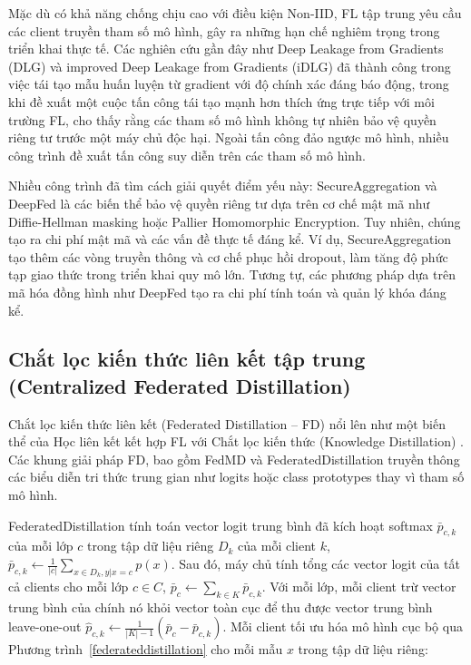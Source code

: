 Mặc dù có khả năng chống chịu cao với điều kiện Non-IID, FL tập trung yêu cầu các client truyền tham số mô hình, gây ra những hạn chế nghiêm trọng trong triển khai thực tế. Các nghiên cứu gần đây như Deep Leakage from Gradients (DLG) \cite{zhu2019dlg} và improved Deep Leakage from Gradients (iDLG) \cite{zhao2020idlg} đã thành công trong việc tái tạo mẫu huấn luyện từ gradient với độ chính xác đáng báo động, trong khi \cite{geiping2020inverting} đề xuất một cuộc tấn công tái tạo mạnh hơn thích ứng trực tiếp với môi trường FL, cho thấy rằng các tham số mô hình không tự nhiên bảo vệ quyền riêng tư trước một máy chủ độc hại. Ngoài tấn công đảo ngược mô hình, nhiều công trình đề xuất tấn công suy diễn \cite{pyrgelis2017knockknock, melis2019mia, ganju2018inference} trên các tham số mô hình.

Nhiều công trình đã tìm cách giải quyết điểm yếu này: SecureAggregation \cite{bonawitz2016secagg} và DeepFed \cite{li2020deepfed} là các biến thể bảo vệ quyền riêng tư dựa trên cơ chế mật mã như Diffie-Hellman masking hoặc Pallier Homomorphic Encryption. Tuy nhiên, chúng tạo ra chi phí mật mã và các vấn đề thực tế đáng kể. Ví dụ, SecureAggregation tạo thêm các vòng truyền thông và cơ chế phục hồi dropout, làm tăng độ phức tạp giao thức trong triển khai quy mô lớn. Tương tự, các phương pháp dựa trên mã hóa đồng hình như DeepFed tạo ra chi phí tính toán và quản lý khóa đáng kể.

\subsection{Chắt lọc kiến thức liên kết tập trung (Centralized Federated Distillation)}
\label{sec:fd}
Chắt lọc kiến thức liên kết (Federated Distillation -- FD) \cite{li2019fedmd, tan2022fedproto, jeong2018federateddistillation} nổi lên như một biến thể của Học liên kết kết hợp FL với Chắt lọc kiến thức (Knowledge Distillation) \cite{hinton2015kd}. Các khung giải pháp FD, bao gồm FedMD \cite{li2019fedmd} và FederatedDistillation \cite{jeong2018federateddistillation} truyền thông các biểu diễn tri thức trung gian như logits hoặc class prototypes \cite{tan2022fedproto} thay vì tham số mô hình.

FederatedDistillation tính toán vector logit trung bình đã kích hoạt softmax $\bar{p}_{c,k}$ của mỗi lớp $c$ trong tập dữ liệu riêng $D_k$ của mỗi client $k$, $\bar{p}_{c,k} \leftarrow \frac{1}{|c|}\sum_{x \in D_k, y|x = c}p(x)$. Sau đó, máy chủ tính tổng các vector logit của tất cả clients cho mỗi lớp $c \in C$, $\bar{p}_c \leftarrow \sum_{k \in K}\bar{p}_{c,k}$. Với mỗi lớp, mỗi client trừ vector trung bình của chính nó khỏi vector toàn cục để thu được vector trung bình leave-one-out $\hat{p}_{c,k} \leftarrow \frac{1}{|K|-1} (\bar{p}_c - \bar{p}_{c,k})$. Mỗi client tối ưu hóa mô hình cục bộ qua Phương trình~\ref{federateddistillation} cho mỗi mẫu $x$ trong tập dữ liệu riêng:

